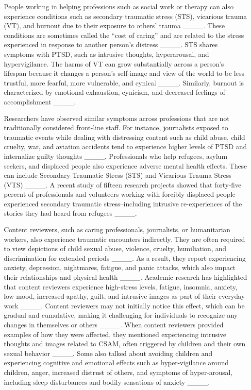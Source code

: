 People working in helping professions such as social work or therapy can also experience conditions such as secondary traumatic stress (STS), vicarious trauma (VT), and burnout due to their exposure to others' trauma ____. These conditions are sometimes called the ``cost of caring'' and are related to the stress experienced in response to another person's distress ____. STS shares symptoms with PTSD, such as intrusive thoughts, hyperarousal, and hypervigilance. The harms of VT can grow substantially across a person's lifespan because it changes a person's self-image and view of the world to be less trustful, more fearful, more vulnerable, and cynical ____. Similarly, burnout is characterized by emotional exhaustion, cynicism, and decreased feelings of accomplishment ____.

Researchers have observed similar symptoms across professions that are not traditionally considered front-line staff. For instance, journalists exposed to traumatic events while dealing with distressing content such as child abuse, child cruelty, war, and aviation accidents tend to experience higher levels of PTSD and internalize guilty thoughts ____. Professionals who help refugees, asylum seekers, and displaced people also experience adverse mental health effects. These can include Secondary Traumatic Stress (STS) and Vicarious Trauma Stress (VTS) ____. A recent study of fifteen research projects showed that forty-five percent of professionals and volunteers working with forcibly displaced people experienced secondary traumatic stress--including intrusive re-experiences of the stories they had heard from refugees ____.

Content reviewers, such as caring professionals, journalists, or humanitarian workers, also experience traumatic encounters indirectly. They are often required to view depictions of child sexual abuse, violence, cruelty, humiliation, and discrimination for extended periods ____. As a result, they report experiencing anxiety, depression, nightmares, fatigue, and panic attacks, which also impact their relationships and physical health ____. Academic research has highlighted that content reviewers experience high-stress levels, fatigue, insomnia, anxiety, low mood, increased apathy, guilt, and intrusive images as part of their everyday work ____. Content reviewers may not initially notice this effect, which can be gradual and cumulative, making it challenging for individuals to recognize any changes in themselves or others ____. When content reviewers provided examples of how they were affected, they mentioned experiencing intrusive thoughts and images related to CSAM, often triggered by children and their own sexual behavior ____. Some also talked about avoiding children and experiencing cognitive and emotional effects such as hyper-vigilance around children, anger, increased distrust of others, and symptoms of hyper-arousal, including sleep disturbances and bodily sensations of anxiety ____. 

